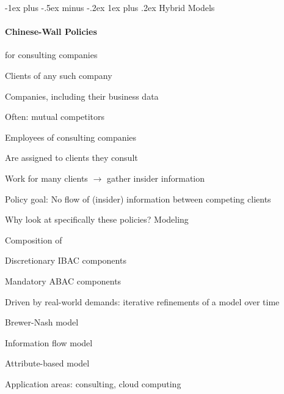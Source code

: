 \documentclass[a4paper]{article}
\makeatletter
\renewcommand{\subsubsection}{\@startsection{subsubsection}{3}{0mm}%
                {-1ex plus -.5ex minus -.2ex}%
                {1ex plus .2ex}%
                {\normalfont\small\bfseries}}
\makeatother
\begin{document}
\begin{multicols}{3}
    \subsubsection{Hybrid Models}
    \paragraph{Chinese-Wall Policies}
    for consulting companies
    \begin{itemize*}
        \item Clients of any such company
        \begin{itemize*}
            \item Companies, including their business data
            \item Often: mutual competitors
        \end{itemize*}
        \item Employees of consulting companies
        \begin{itemize*}
            \item Are assigned to clients they consult
            \item Work for many clients $\rightarrow$ gather insider information
        \end{itemize*}
        \item Policy goal: No flow of (insider) information between competing clients
    \end{itemize*}

    Why look at specifically these policies? Modeling
    \begin{itemize*}
        \item Composition of
        \begin{itemize*}
            \item Discretionary IBAC components
            \item Mandatory ABAC components
        \end{itemize*}
        \item Driven by real-world demands: iterative refinements of a model over time
        \begin{itemize*}
            \item Brewer-Nash model
            \item Information flow model
            \item Attribute-based model
        \end{itemize*}
        \item Application areas: consulting, cloud computing
    \end{itemize*}


\end{multicols}
\end{document}

